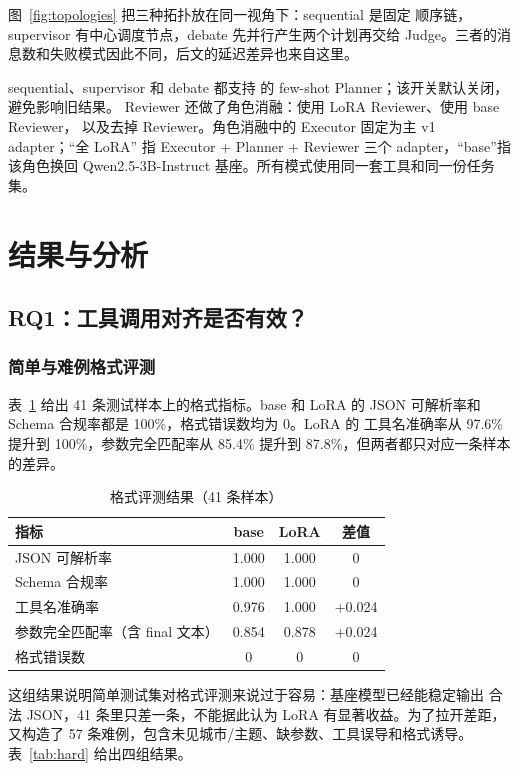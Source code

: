 \documentclass[UTF8,a4paper,12pt]{ctexart}
\begin{document}
图~\ref{fig:topologies} 把三种拓扑放在同一视角下：sequential 是固定
顺序链，supervisor 有中心调度节点，debate 先并行产生两个计划再交给
Judge。三者的消息数和失败模式因此不同，后文的延迟差异也来自这里。

sequential、supervisor 和 debate 都支持  的
few-shot Planner；该开关默认关闭，避免影响旧结果。
Reviewer 还做了角色消融：使用 LoRA Reviewer、使用 base Reviewer，
以及去掉 Reviewer。角色消融中的 Executor 固定为主 v1 adapter；“全 LoRA”
指 Executor + Planner + Reviewer 三个 adapter，“base”指该角色换回
Qwen2.5-3B-Instruct 基座。所有模式使用同一套工具和同一份任务集。

\clearpage
\section{结果与分析}
\subsection{RQ1：工具调用对齐是否有效？}
\subsubsection{简单与难例格式评测}
表~\ref{tab:format} 给出 41 条测试样本上的格式指标。base 和 LoRA 的
JSON 可解析率和 Schema 合规率都是 100\%，格式错误数均为 0。LoRA 的
工具名准确率从 97.6\% 提升到 100\%，参数完全匹配率从 85.4\% 提升到
87.8\%，但两者都只对应一条样本的差异。

\begin{table}[H]
  \centering
  \caption{格式评测结果（41 条样本）}
  \label{tab:format}
  \begin{tabular}{lccc}
    \toprule
    指标 & base & LoRA & 差值 \\
    \midrule
    JSON 可解析率 & 1.000 & 1.000 & 0 \\
    Schema 合规率 & 1.000 & 1.000 & 0 \\
    工具名准确率 & 0.976 & 1.000 & +0.024 \\
    参数完全匹配率（含 final 文本） & 0.854 & 0.878 & +0.024 \\
    格式错误数 & 0 & 0 & 0 \\
    \bottomrule
  \end{tabular}
\end{table}

这组结果说明简单测试集对格式评测来说过于容易：基座模型已经能稳定输出
合法 JSON，41 条里只差一条，不能据此认为 LoRA 有显著收益。为了拉开差距，
又构造了 57 条难例，包含未见城市/主题、缺参数、工具误导和格式诱导。
表~\ref{tab:hard} 给出四组结果。
\end{document}

